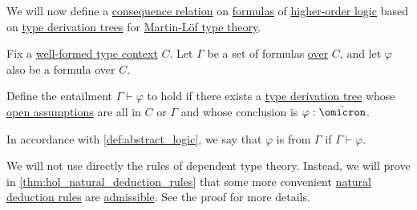 \begin{definition}\label{def:hol_entailment}
  We will now define a \hyperref[def:consequence_relation]{consequence relation} on \hyperref[def:hol_term/formula]{formulas} of \hyperref[
  def:higher_order_logic]{higher-order logic} based on \hyperref[def:type_derivation_tree]{type derivation trees} for \hyperref[def:martin_lof_type_theory]{Martin-L\"of type theory}.

  Fix a \hyperref[def:mltt_well_formed_context]{well-formed type context} \( C \). Let \( \Gamma \) be a set of formulas \hyperref[def:hol_term/over]{over} \( C \), and let \( \varphi \) also be a formula over \( C \).

  Define the entailment \( \Gamma \vdash \varphi \) to hold if there exists a \hyperref[def:type_derivation_tree]{type derivation tree} whose \hyperref[def:type_derivation_tree]{open assumptions} are all in \( C \) or \( \Gamma \) and whose conclusion is \( \varphi: \syn\omicron \).

  In accordance with \cref{def:abstract_logic}, we say that \( \varphi \) is  from \( \Gamma \) if \( \Gamma \vdash \varphi \).
\end{definition}
\begin{comments}
  \item We will not use directly the rules of dependent type theory. Instead, we will prove in \cref{thm:hol_natural_deduction_rules} that some more convenient \hyperref[def:natural_deduction_rule]{natural deduction rules} are \hyperref[con:inference_rule_admissibility]{admissible}. See the proof for more details.
\end{comments}

